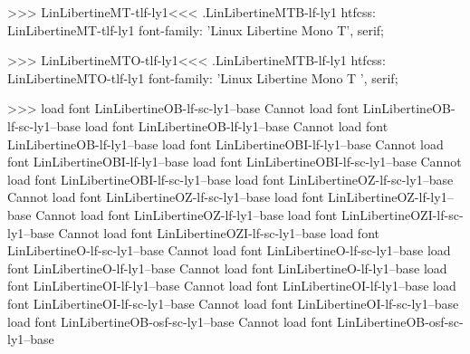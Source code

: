 >>>
\<LinLibertineMT-tlf-ly1\><<<
.LinLibertineMTB-lf-ly1
htfcss:  LinLibertineMT-tlf-ly1  font-family: 'Linux Libertine Mono T', serif;

>>>
\<LinLibertineMTO-tlf-ly1\><<<
.LinLibertineMTB-lf-ly1
htfcss:  LinLibertineMTO-tlf-ly1  font-family: 'Linux Libertine Mono T ', serif;

>>>
load font	LinLibertineOB-lf-sc-ly1--base
Cannot load font LinLibertineOB-lf-sc-ly1--base
load font	LinLibertineOB-lf-ly1--base
Cannot load font LinLibertineOB-lf-ly1--base
load font	LinLibertineOBI-lf-ly1--base
Cannot load font LinLibertineOBI-lf-ly1--base
load font	LinLibertineOBI-lf-sc-ly1--base
Cannot load font LinLibertineOBI-lf-sc-ly1--base
load font	LinLibertineOZ-lf-sc-ly1--base
Cannot load font LinLibertineOZ-lf-sc-ly1--base
load font	LinLibertineOZ-lf-ly1--base
Cannot load font LinLibertineOZ-lf-ly1--base
load font	LinLibertineOZI-lf-sc-ly1--base
Cannot load font LinLibertineOZI-lf-sc-ly1--base
load font	LinLibertineO-lf-sc-ly1--base
Cannot load font LinLibertineO-lf-sc-ly1--base
load font	LinLibertineO-lf-ly1--base
Cannot load font LinLibertineO-lf-ly1--base
load font	LinLibertineOI-lf-ly1--base
Cannot load font LinLibertineOI-lf-ly1--base
load font	LinLibertineOI-lf-sc-ly1--base
Cannot load font LinLibertineOI-lf-sc-ly1--base
load font	LinLibertineOB-osf-sc-ly1--base
Cannot load font LinLibertineOB-osf-sc-ly1--base
